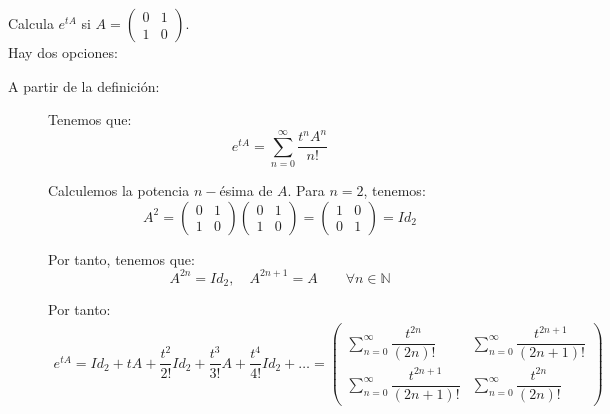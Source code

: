 \documentclass[12pt]{article}
\begin{document}
    \begin{ejercicio}
        Calcula $e^{tA}$ si $\displaystyle A = \displaystyle
        \begin{pmatrix}
            0 & 1 \\
            1 & 0
        \end{pmatrix}$.\\

        Hay dos opciones:
        \begin{description}
            \item[A partir de la definición:] Tenemos que:
            \begin{equation*}
                e^{tA} = \sum_{n=0}^{\infty} \dfrac{t^nA^n}{n!}
            \end{equation*}

            Calculemos la potencia $n-$ésima de $A$. Para $n=2$, tenemos:
            \begin{equation*}
                A^2 = \displaystyle
                \begin{pmatrix}
                    0 & 1 \\
                    1 & 0
                \end{pmatrix}
                \displaystyle
                \begin{pmatrix}
                    0 & 1 \\
                    1 & 0
                \end{pmatrix}
                = \displaystyle
                \begin{pmatrix}
                    1 & 0 \\
                    0 & 1
                \end{pmatrix} = Id_2
            \end{equation*}

            Por tanto, tenemos que:
            \begin{equation*}
                A^{2n}=Id_2,\quad A^{2n+1}=A\qquad \forall n\in\mathbb{N}
            \end{equation*}

            Por tanto:
            \begin{align*}
                e^{tA} = Id_2 + tA + \dfrac{t^2}{2!}Id_2 + \dfrac{t^3}{3!}A + \dfrac{t^4}{4!}Id_2+\dots
                = \begin{pmatrix}
                    \sum\limits_{n=0}^{\infty} \dfrac{t^{2n}}{(2n)!} & \sum\limits_{n=0}^{\infty} \dfrac{t^{2n+1}}{(2n+1)!} \\
                    \sum\limits_{n=0}^{\infty} \dfrac{t^{2n+1}}{(2n+1)!} & \sum\limits_{n=0}^{\infty} \dfrac{t^{2n}}{(2n)!}
                \end{pmatrix}
            \end{align*}


\end{description}
\end{ejercicio}
\end{document}
